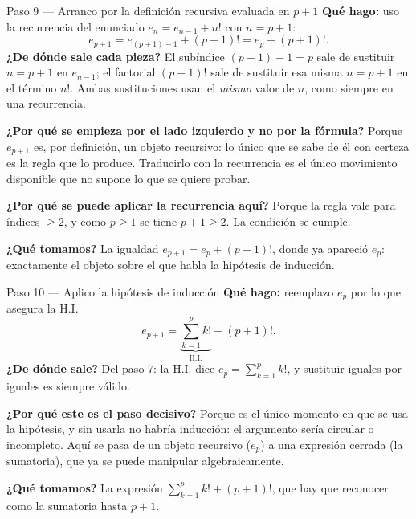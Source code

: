 \documentclass[11pt]{article}
\begin{document}
\begin{paso}{Paso 9 --- Arranco por la definición recursiva evaluada en $p+1$}
\textbf{Qué hago:} uso la recurrencia del enunciado $e_n=e_{n-1}+n!$ con $n=p+1$:
\[
e_{p+1} = e_{(p+1)-1} + (p+1)! = e_{p} + (p+1)! .
\]
\textbf{¿De dónde sale cada pieza?} El subíndice $(p+1)-1=p$ sale de sustituir $n=p+1$ en $e_{n-1}$; el factorial $(p+1)!$ sale de sustituir esa misma $n=p+1$ en el término $n!$. Ambas sustituciones usan el \emph{mismo} valor de $n$, como siempre en una recurrencia.

\textbf{¿Por qué se empieza por el lado izquierdo y no por la fórmula?} Porque $e_{p+1}$ es, por definición, un objeto recursivo: lo único que se sabe de él con certeza es la regla que lo produce. Traducirlo con la recurrencia es el único movimiento disponible que no supone lo que se quiere probar.

\textbf{¿Por qué se puede aplicar la recurrencia aquí?} Porque la regla vale para índices $\ge 2$, y como $p\ge 1$ se tiene $p+1\ge 2$. La condición se cumple.

\textbf{¿Qué tomamos?} La igualdad $e_{p+1}=e_p+(p+1)!$, donde ya apareció $e_p$: exactamente el objeto sobre el que habla la hipótesis de inducción.
\end{paso}

\begin{paso}{Paso 10 --- Aplico la hipótesis de inducción}
\textbf{Qué hago:} reemplazo $e_p$ por lo que asegura la H.I.
\[
e_{p+1} = \underbrace{\sum_{k=1}^{p}k!}_{\text{H.I.}} + (p+1)! .
\]
\textbf{¿De dónde sale?} Del paso 7: la H.I. dice $e_p=\sum_{k=1}^{p}k!$, y sustituir iguales por iguales es siempre válido.

\textbf{¿Por qué este es el paso decisivo?} Porque es el único momento en que se usa la hipótesis, y sin usarla no habría inducción: el argumento sería circular o incompleto. Aquí se pasa de un objeto recursivo ($e_p$) a una expresión cerrada (la sumatoria), que ya se puede manipular algebraicamente.

\textbf{¿Qué tomamos?} La expresión $\sum_{k=1}^{p}k! + (p+1)!$, que hay que reconocer como la sumatoria hasta $p+1$.
\end{paso}
\end{document}
